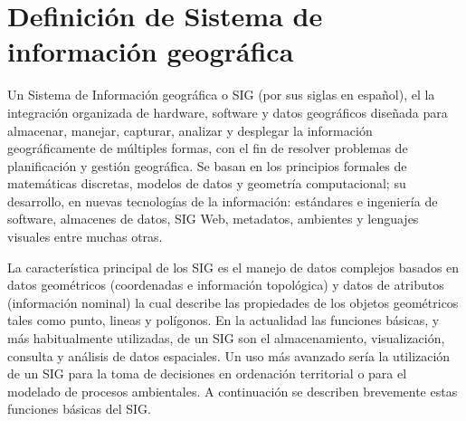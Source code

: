 \section{Definición de Sistema de información geográfica}
\label{sec:cap2-definicion-sig}

Un Sistema de Información geográfica o SIG (por sus siglas en español), el la integración
organizada de hardware, software y datos geográficos diseñada para almacenar, manejar, capturar,
analizar y desplegar la información geográficamente de múltiples formas, con el fin de resolver
problemas de planificación y gestión geográfica\citep{lopezMarcos2007}. Se basan en los principios
formales de matemáticas discretas, modelos de datos y geometría computacional; su desarrollo, en
nuevas tecnologías de la información: estándares e ingeniería de software, almacenes de datos,
SIG Web, metadatos, ambientes y lenguajes visuales entre muchas otras\citep{lunaPaulina2010}.

La característica principal de los SIG es el manejo de datos complejos basados en datos
geométricos (coordenadas e información topológica) y datos de atributos (información nominal) la
cual describe las propiedades de los objetos geométricos tales como punto, lineas y polígonos. En
la actualidad las funciones básicas, y más habitualmente utilizadas, de un SIG son el
almacenamiento, visualización, consulta y análisis de datos espaciales. Un uso más avanzado sería
la utilización de un SIG para la toma de decisiones en ordenación territorial o para el modelado
de procesos ambientales. A continuación se describen brevemente estas funciones básicas del SIG.

